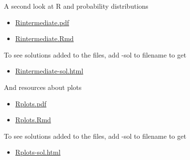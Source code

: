 \documentclass[10pt,ignorenonframetext,]{beamer}
\providecommand{\tightlist}{%
  \setlength{\itemsep}{0pt}\setlength{\parskip}{0pt}}
\begin{document}
\begin{frame}

\begin{block}{A second look at R and probability distributions}

\vspace{6mm}

\begin{itemize}
\tightlist
\item
  \href{https://github.com/stefaniemuff/statlearning/blob/master/1Intro/Rintermediate.pdf}{Rintermediate.pdf}
\item
  \href{https://github.com/stefaniemuff/statlearning/blob/master/1Intro/Rintermediate.Rmd}{Rintermediate.Rmd}
\end{itemize}

To see solutions added to the files, add -sol to filename to get

\begin{itemize}
\tightlist
\item
  \href{https://github.com/stefaniemuff/statlearning/blob/master/1Intro/Rintermediate-sol.html}{Rintermediate-sol.html}
\end{itemize}

\end{block}

\end{frame}

\begin{frame}

\begin{block}{And resources about plots}

\vspace{6mm}

\begin{itemize}
\tightlist
\item
  \href{https://github.com/stefaniemuff/statlearning/blob/master/1Intro/Rplots.pdf}{Rplots.pdf}
\item
  \href{https://github.com/stefaniemuff/statlearning/blob/master/1Intro/Rplots.Rmd}{Rplots.Rmd}
\end{itemize}

To see solutions added to the files, add -sol to filename to get

\begin{itemize}
\tightlist
\item
  \href{https://github.com/stefaniemuff/statlearning/blob/master/1Intro/Rplots-sol.html}{Rplots-sol.html}
\end{itemize}

\end{block}

\end{frame}
\end{document}
